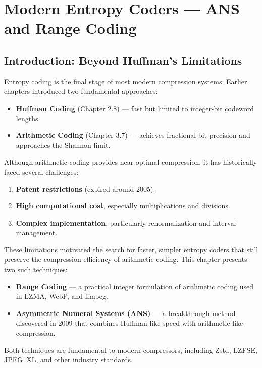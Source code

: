 \section{Modern Entropy Coders — ANS and Range Coding}

\subsection{Introduction: Beyond Huffman's Limitations}

Entropy coding is the final stage of most modern compression systems.  
Earlier chapters introduced two fundamental approaches:

\begin{itemize}
    \item \textbf{Huffman Coding} (Chapter 2.8) — fast but limited to integer-bit codeword lengths.
    \item \textbf{Arithmetic Coding} (Chapter 3.7) — achieves fractional-bit precision and approaches the Shannon limit.
\end{itemize}

Although arithmetic coding provides near-optimal compression, it has historically faced several challenges:

\begin{enumerate}
    \item \textbf{Patent restrictions} (expired around 2005).
    \item \textbf{High computational cost}, especially multiplications and divisions.
    \item \textbf{Complex implementation}, particularly renormalization and interval management.
\end{enumerate}

These limitations motivated the search for faster, simpler entropy coders that still preserve the compression efficiency of arithmetic coding.  
This chapter presents two such techniques:

\begin{itemize}
    \item \textbf{Range Coding} — a practical integer formulation of arithmetic coding used in LZMA, WebP, and ffmpeg.
    \item \textbf{Asymmetric Numeral Systems (ANS)} — a breakthrough method discovered in 2009 that combines Huffman-like speed with arithmetic-like compression.
\end{itemize}

Both techniques are fundamental to modern compressors, including Zstd, LZFSE, JPEG~XL, and other industry standards.

